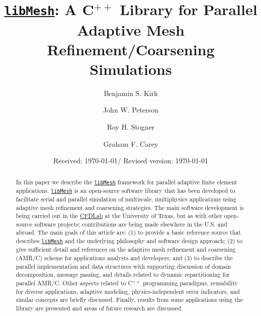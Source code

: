 \documentclass[global,twocolumn,final]{svjour}
\newcommand{\libMesh}{\href{http://libmesh.sourceforge.net}{\texttt{lib\-Mesh}}}
\newcommand{\CFDLab}{\href{http://cfdlab.ae.utexas.edu}{CFDLab}}
\newcommand{\cpp}{C{\tiny$^{++}$}}
\begin{document}
  
\title{\libMesh:
  A \cpp{} Library for Parallel Adaptive Mesh Refinement/Coarsening Simulations}
\author{Benjamin S. Kirk \and John W. Peterson \and Roy H. Stogner \and Graham F. Carey}
%
\date{Received: \today / Revised version: \today}
\maketitle



\begin{abstract}
In this paper we describe the \libMesh{} framework for parallel
adaptive finite element applications.  \libMesh{} is an open-source
software library that has been developed to facilitate serial and
parallel simulation of multiscale, multiphysics applications using
adaptive mesh refinement and coarsening strategies.  The main software
development is being carried out in the \CFDLab{} at the University of
Texas, but as with other open-source software projects; contributions
are being made elsewhere in the U.S. and abroad.  The main goals of
this article are: (1) to provide a basic reference source that
describes \libMesh{} and the underlying philosophy and software design
approach; (2) to give sufficient detail and references on the adaptive
mesh refinement and coarsening (AMR/C) scheme for applications
analysts and developers; and (3) to describe the parallel
implementation and data structures with supporting discussion of
domain decomposition, message passing, and details related to dynamic
repartitioning for parallel AMR/C.  Other aspects related to \cpp{}
programming paradigms, reusability for diverse applications, adaptive
modeling, physics-independent error indicators, and similar concepts
are briefly discussed. Finally, results from some applications using
the library are presented and areas of future research are discussed.
\end{abstract}


\end{document}
